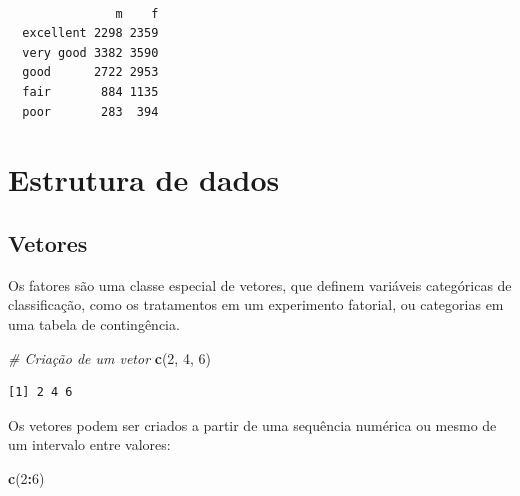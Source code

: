 \documentclass[12pt,brazil,oneside]{book}
\newenvironment{Shaded}{\begin{snugshade}}{\end{snugshade}}
\newcommand{\CommentTok}[1]{\textcolor[rgb]{0.56,0.35,0.01}{\textit{#1}}}
\newcommand{\DecValTok}[1]{\textcolor[rgb]{0.00,0.00,0.81}{#1}}
\newcommand{\KeywordTok}[1]{\textcolor[rgb]{0.13,0.29,0.53}{\textbf{#1}}}
\newcommand{\NormalTok}[1]{#1}
\newcommand{\OperatorTok}[1]{\textcolor[rgb]{0.81,0.36,0.00}{\textbf{#1}}}
\begin{document}
\begin{Shaded}
\end{Shaded}

\begin{verbatim}
           
               m    f
  excellent 2298 2359
  very good 3382 3590
  good      2722 2953
  fair       884 1135
  poor       283  394
\end{verbatim}

\hypertarget{estrutura-de-dados}{%
\section{Estrutura de dados}\label{estrutura-de-dados}}

\hypertarget{vetores}{%
\subsection{Vetores}\label{vetores}}

Os fatores são uma classe especial de vetores, que definem variáveis categóricas de classificação, como os tratamentos em um experimento fatorial, ou categorias em uma tabela de contingência.

\begin{Shaded}
\begin{Highlighting}[]
\CommentTok{# Criação de um vetor}
\KeywordTok{c}\NormalTok{(}\DecValTok{2}\NormalTok{, }\DecValTok{4}\NormalTok{, }\DecValTok{6}\NormalTok{)}
\end{Highlighting}
\end{Shaded}

\begin{verbatim}
[1] 2 4 6
\end{verbatim}

Os vetores podem ser criados a partir de uma sequência numérica ou mesmo de um intervalo entre valores:

\begin{Shaded}
\begin{Highlighting}[]
\KeywordTok{c}\NormalTok{(}\DecValTok{2}\OperatorTok{:}\DecValTok{6}\NormalTok{)}
\end{Highlighting}
\end{Shaded}
\end{document}
